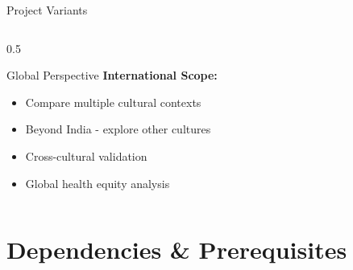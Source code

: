 \documentclass[aspectratio=169]{beamer}
\begin{document}
\begin{frame}{Project Variants}
\begin{columns}[t]
\begin{column}{0.5\textwidth}
            \begin{block}{Global Perspective}
                \textbf{International Scope:}
                \begin{itemize}
                    \item Compare multiple cultural contexts
                    \item Beyond India - explore other cultures
                    \item Cross-cultural validation
                    \item Global health equity analysis
                \end{itemize}
            \end{block}
        \end{column}
    \end{columns}
\end{frame}

\section{Dependencies \& Prerequisites}
\end{document}
